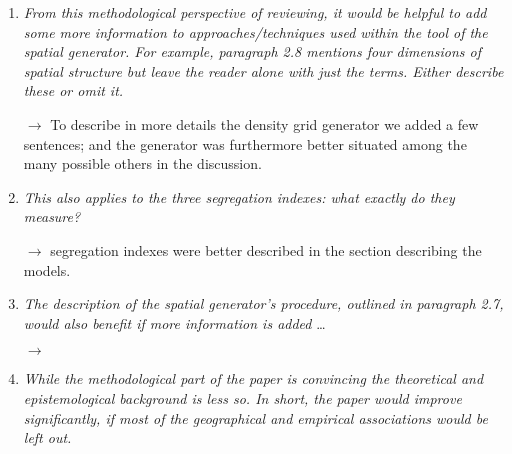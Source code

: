 \documentclass[11pt,a4paper,sans]{moderncv}        %
\begin{document}
\begin{enumerate}
 	\item \textit{From this methodological perspective of reviewing, it would be helpful to add some more information to approaches/techniques used within the tool of the spatial generator. For example, paragraph 2.8 mentions four dimensions of spatial structure but leave the reader alone with just the terms. Either describe these or omit it.}
   
   $\rightarrow$ To describe in more details the density grid generator we added a few sentences; and the generator was furthermore better situated among the many possible others in the discussion.
	  
  \medskip
  
   \item \textit{This also applies to the three segregation indexes: what exactly do they measure?}
  
  $\rightarrow$ segregation indexes were better described in the section describing the models.
  
  \medskip
  
  \item \textit{The description of the spatial generator’s procedure, outlined in paragraph 2.7, would also benefit if more information is added} \ldots
  
  $\rightarrow$ 

  \medskip

  \item \textit{While the methodological part of the paper is convincing the theoretical and epistemological background is less so. In short, the paper would improve significantly, if most of the geographical and empirical associations would be left out.}
   

\end{enumerate}
\end{document}

